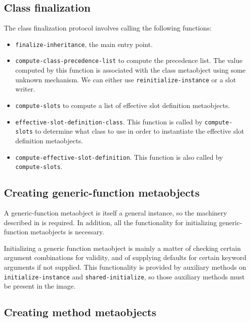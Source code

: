 \subsection{Class finalization}

The class finalization protocol involves calling the following
functions:

\begin{itemize}
\item \texttt{finalize-inheritance}, the main entry point.
\item \texttt{compute-class-precedence-list} to compute the
  precedence list.  The value computed by this function is associated
  with the class metaobject using some unknown mechanism.  We can
  either use \texttt{reinitialize-instance} or a slot writer.
\item \texttt{compute-slots} to compute a list of effective
  slot definition metaobjects.
\item \texttt{effective-slot-definition-class}.  This function is
  called by \texttt{compute-slots} to determine what class to use in
  order to instantiate the effective slot definition metaobjects.
\item \texttt{compute-effective-slot-definition}.  This function is
  also called by \texttt{compute-slots}.
\end{itemize}

\subsection{Creating generic-function metaobjects}

A generic-function metaobject is itself a general instance, so the
machinery described in
 is required.  In
addition, all the functionality for initializing generic-function
metaobjects is necessary.

Initializing a generic function metaobject is mainly a matter of
checking certain argument combinations for validity, and of supplying
defaults for certain keyword arguments if not supplied.  This
functionality is provided by auxiliary methods on
\texttt{initialize-instance} and \texttt{shared-initialize}, so those
auxiliary methods must be present in the image.

\subsection{Creating method metaobjects}

